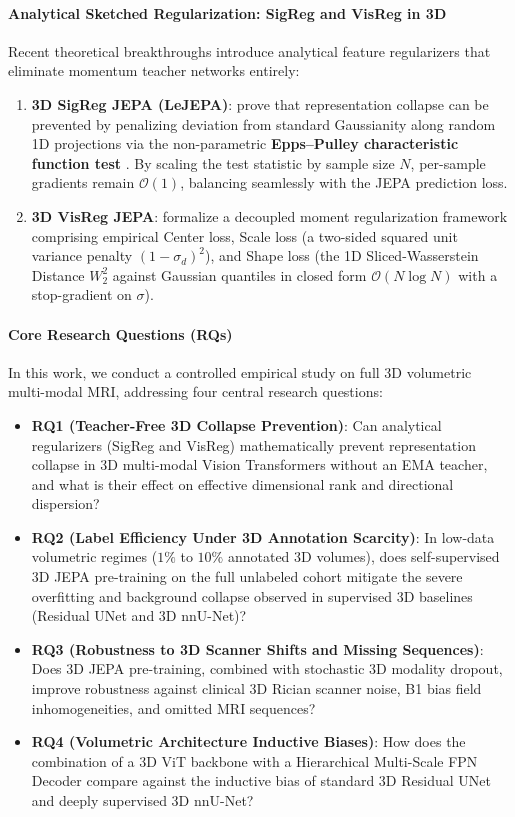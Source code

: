 \documentclass{article}
\begin{document}
\paragraph{Analytical Sketched Regularization: SigReg and VisReg in 3D}
Recent theoretical breakthroughs introduce analytical feature regularizers that eliminate momentum teacher networks entirely:
\begin{enumerate}
    \item \textbf{3D SigReg JEPA (LeJEPA)}: \citet{balestriero2025lejepa} prove that representation collapse can be prevented by penalizing deviation from standard Gaussianity along random 1D projections via the non-parametric \textbf{Epps--Pulley characteristic function test} \citep{epps1983test,cramer1936theorems}. By scaling the test statistic by sample size $N$, per-sample gradients remain $\mathcal{O}(1)$, balancing seamlessly with the JEPA prediction loss.
    \item \textbf{3D VisReg JEPA}: \citet{wu2026visreg} formalize a decoupled moment regularization framework comprising empirical Center loss, Scale loss (a two-sided squared unit variance penalty $(1-\sigma_d)^2$), and Shape loss (the 1D Sliced-Wasserstein Distance $W_2^2$ against Gaussian quantiles in closed form $\mathcal{O}(N \log N)$ with a stop-gradient on $\sigma$).
\end{enumerate}

\paragraph{Core Research Questions (RQs)}
In this work, we conduct a controlled empirical study on full 3D volumetric multi-modal MRI, addressing four central research questions:
\begin{itemize}
    \item \textbf{RQ1 (Teacher-Free 3D Collapse Prevention)}: Can analytical regularizers (SigReg and VisReg) mathematically prevent representation collapse in 3D multi-modal Vision Transformers without an EMA teacher, and what is their effect on effective dimensional rank and directional dispersion?
    \item \textbf{RQ2 (Label Efficiency Under 3D Annotation Scarcity)}: In low-data volumetric regimes ($1\%$ to $10\%$ annotated 3D volumes), does self-supervised 3D JEPA pre-training on the full unlabeled cohort mitigate the severe overfitting and background collapse observed in supervised 3D baselines (Residual UNet and 3D nnU-Net)?
    \item \textbf{RQ3 (Robustness to 3D Scanner Shifts and Missing Sequences)}: Does 3D JEPA pre-training, combined with stochastic 3D modality dropout, improve robustness against clinical 3D Rician scanner noise, B1 bias field inhomogeneities, and omitted MRI sequences?
    \item \textbf{RQ4 (Volumetric Architecture Inductive Biases)}: How does the combination of a 3D ViT backbone with a Hierarchical Multi-Scale FPN Decoder compare against the inductive bias of standard 3D Residual UNet and deeply supervised 3D nnU-Net?
\end{itemize}
\end{document}
